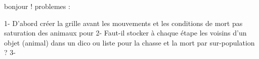 

bonjour !
problemes :

1- D'abord créer la grille avant les mouvements et les conditions de mort pas saturation des animaux pour 
2- Faut-il stocker à chaque étape les voisins d'un objet (animal) dans un dico ou liste pour la chasse et la mort par sur-population ?
3- 


 



